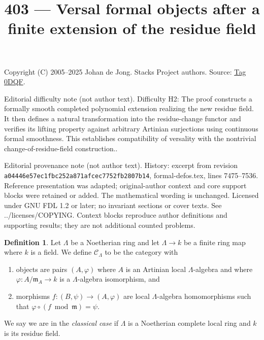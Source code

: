 \documentclass{amsart}
\theoremstyle{plain}
\theoremstyle{definition}
\newtheorem{definition}[subsection]{Definition}
\theoremstyle{remark}
\numberwithin{equation}{subsection}
\begin{document}
\title[Stacks Project, Tag 0DQF]{403 --- Versal formal objects after a finite extension of the residue field}
\maketitle
\noindent Copyright (C) 2005--2025 Johan de Jong. Stacks Project authors. Source: \href{https://stacks.math.columbia.edu/tag/0DQF}{Tag 0DQF}.

\noindent Editorial difficulty note (not author text). Difficulty H2: The proof constructs a formally smooth completed polynomial extension realizing the new residue field. It then defines a natural transformation into the residue-change functor and verifies its lifting property against arbitrary Artinian surjections using continuous formal smoothness. This establishes compatibility of versality with the nontrivial change-of-residue-field construction..

\noindent Editorial provenance note (not author text). History: excerpt from revision \texttt{a0444\allowbreak 6e57e\allowbreak c1fbc\allowbreak 252a8\allowbreak 71afc\allowbreak ec775\allowbreak 2fb28\allowbreak 07b14}, formal-defos.tex, lines 7475--7536. Reference presentation was adapted; original-author context and core support blocks were retained or added. The mathematical wording is unchanged. Licensed under GNU FDL 1.2 or later; no invariant sections or cover texts. See ../licenses/COPYING. Context blocks reproduce author definitions and supporting results; they are not additional counted problems.

\begin{definition}
\label{definition-CLambda}
Let $\Lambda$ be a Noetherian ring and let $\Lambda \to k$ be a finite
ring map where $k$ is a field. We define {\it $\mathcal{C}_\Lambda$} to be
the category with
\begin{enumerate}
\item objects are pairs $(A, \varphi)$ where $A$ is an Artinian local
$\Lambda$-algebra and where $\varphi : A/\mathfrak m_A \to k$ is a
$\Lambda$-algebra isomorphism, and
\item morphisms $f : (B, \psi) \to (A, \varphi)$ are local $\Lambda$-algebra
homomorphisms such that $\varphi \circ (f \bmod \mathfrak m) = \psi$.
\end{enumerate}
We say we are in the {\it classical case} if $\Lambda$ is a Noetherian
complete local ring and $k$ is its residue field.
\end{definition}
\end{document}

